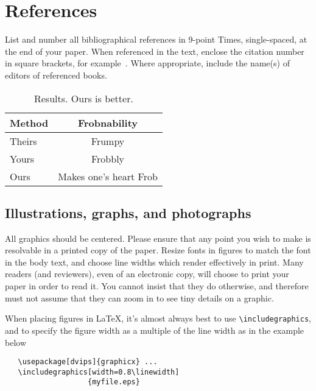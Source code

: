 \documentclass[10pt,twocolumn,letterpaper]{article}
\begin{document}
\section{References}

List and number all bibliographical references in 9-point Times,
single-spaced, at the end of your paper. When referenced in the text,
enclose the citation number in square brackets, for
example~\cite{Authors14}.  Where appropriate, include the name(s) of
editors of referenced books.

\begin{table}
\begin{center}
\begin{tabular}{|l|c|}
\hline
Method & Frobnability \\
\hline\hline
Theirs & Frumpy \\
Yours & Frobbly \\
Ours & Makes one's heart Frob\\
\hline
\end{tabular}
\end{center}
\caption{Results.   Ours is better.}
\end{table}

\subsection{Illustrations, graphs, and photographs}

All graphics should be centered.  Please ensure that any point you wish to
make is resolvable in a printed copy of the paper.  Resize fonts in figures
to match the font in the body text, and choose line widths which render
effectively in print.  Many readers (and reviewers), even of an electronic
copy, will choose to print your paper in order to read it.  You cannot
insist that they do otherwise, and therefore must not assume that they can
zoom in to see tiny details on a graphic.

When placing figures in \LaTeX, it's almost always best to use
\verb+\includegraphics+, and to specify the  figure width as a multiple of
the line width as in the example below
{\small\begin{verbatim}
   \usepackage[dvips]{graphicx} ...
   \includegraphics[width=0.8\linewidth]
                   {myfile.eps}
\end{verbatim}
}


\end{document}
